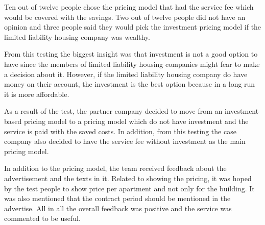 Ten out of twelve people chose the pricing model that had the service fee which would be covered with the savings. Two out of twelve people did not have an opinion and three people said they would pick the investment pricing model if the limited liability housing company was wealthy.

From this testing the biggest insight was that investment is not a good option to have since the members of limited liability housing companies might fear to make a decision about it. However, if the limited liability housing company do have money on their account, the investment is the best option because in a long run it is more affordable.

As a result of the test, the partner company decided to move from an investment based pricing model to a pricing model which do not have investment and the service is paid with the saved costs. In addition, from this testing the case company also decided to have the service fee without investment as the main pricing model.

In addition to the pricing model, the team received feedback about the advertisement and the texts in it. Related to showing the pricing, it was hoped by the test people to show price per apartment and not only for the building. It was also mentioned that the contract period should be mentioned in the advertise. All in all the overall feedback was positive and the service was commented to be useful.




